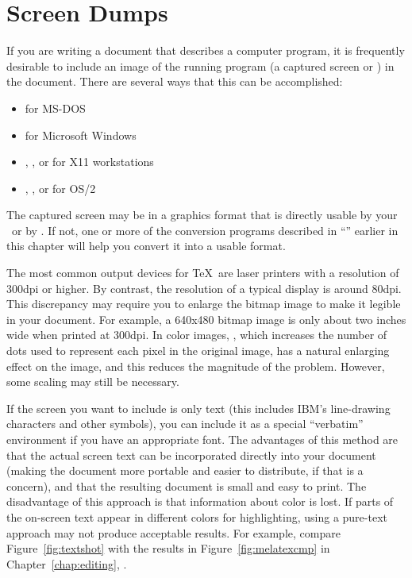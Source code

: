 \section{Screen Dumps}
\label{sec:screendump}

If you are writing a document that describes a computer program, it is
frequently desirable to include an image of the running program (a
captured screen or ) in the document.  There are several ways
that this can be 
accomplished:

\begin{itemize}
  \item {}  for MS-DOS
  \item {} for Microsoft Windows
  \item {}, , or  for X11
        workstations
  \item {}, , or  for OS/2
\end{itemize}

The captured screen may be in a graphics format that is directly usable
by your \dvidriver\ or by .  If not, one or more of the
conversion programs described in ``'' earlier in
this chapter will help you convert it into a usable format.

The most common output devices for \TeX\ are laser printers with a
resolution of 300dpi or higher.  By contrast, the resolution of a
typical display is around 80dpi.  This discrepancy may require you to
enlarge the bitmap image to make it legible in your document.
For example, a 640x480 bitmap image is only about two inches wide when
printed at 300dpi.  In color images, \emph{}, which increases the
number of dots used to represent each pixel in the original image, has
a natural enlarging effect on the image, and this reduces the magnitude of
the problem.  However, some scaling may still be necessary.

If the screen you want to include is only text (this includes IBM's
line-drawing characters and other symbols), you can include it as a
special ``verbatim'' environment if you have an appropriate font.  The
advantages of this method are that the actual screen text can be
incorporated directly into your document (making the document more
portable and easier to distribute, if that is a concern), and that the
resulting document is small and easy to print.  The disadvantage of
this approach is that information about color is lost.
If parts of the on-screen text appear in different colors for
highlighting, using a pure-text approach may not produce
acceptable results.  For example, compare Figure~\ref{fig:textshot} with
the results in Figure~\ref{fig:melatexcmp} in Chapter~\ref{chap:editing},
{\it{}}.

